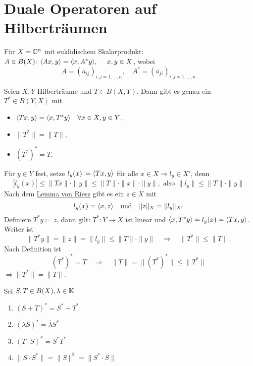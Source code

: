 


\section{Duale Operatoren auf Hilberträumen}



Für $X = \mathbb{C}^{n}$ mit euklidischem Skalarprodukt: \\
$A \in B(X) \colon \< A x , y \> = \< x , A^{*} y \>, \quad x, y \in X$, wobei
\[ A = (a_{ij})_{i, j = 1, \dotsc, n}, \quad A^{*} = (\overline{a_{ji}})_{i, j = 1, \dotsc, n} \]


\begin{satz}
	Seien $X, Y$ Hilberträume und $T \in B(X, Y)$. Dann gibt es genau ein $T^{*} \in B(Y, X)$ mit
	\begin{itemize}
		\item $\langle T x , y \rangle = \langle x , T^{*} y \rangle \quad \forall x \in X, y \in Y$,
		\item $\| T^{*} \| = \| T \|$,
		\item $\left(T	^{*}\right)^{*} = T$.
	\end{itemize}	
\end{satz}

\begin{beweis}
	Für $y \in Y$ fest, setze $l_{y}(x) \coloneqq \langle T x , y \rangle$ für alle $x \in X \Rightarrow l_{y} \in X'$, denn
	\[ | l_{y}(x) | \leq \| T x \| \cdot \| y \| \leq \|T \| \cdot \| x \| \cdot \| y \|, \text{ also } \| l_{y} \| \leq \| T \| \cdot \| y \| \]
	Nach dem \hyperref[lemma:6.3-Riesz]{Lemma von Riesz} gibt es ein $z \in X$ mit
	\[ l_{y} (x) = \langle x , z \rangle \quad \text{und} \quad \| z \|_{X} = \| l_{y} \|_{X'} \]
	Definiere $T^{*} y \coloneqq z$, dann gilt: $T^{*} \colon Y \rightarrow X$ ist linear und $\langle x , T^{*} y \rangle = l_{y}(x) = \langle T x , y \rangle$. \\
	Weiter ist 
	\[ \| T^{*} y \| = \| z \| = \| l_{y} \| \leq \| T \| \cdot \| y \| \quad \Rightarrow \quad \| T^{*} \| \leq \| T \|. \]
	Nach Definition ist 
	\[ \left( T^{*} \right)^{*} = T \quad \Rightarrow \quad \| T \| = \| \left( T^{*} \right)^{*} \| \leq \| T^{*} \| \]
	$\Rightarrow \| T^{*} \| = \| T \|$. 
\end{beweis}


\begin{bemerkung} \label{bem:19.2}
	Sei $S, T \in B(X), \lambda \in \mathbb{K}$
	\begin{enumerate}[label=\alph*\upshape)]
		\item $\left( S + T \right)^{*} = S^{*} + T^{*}$
		\item $\left( \lambda S \right)^{*} = \overline{\lambda} S^{*}$
		\item $\left( T \cdot S \right)^{*} = S^{*} T^{*}$
		\item $\| S \cdot S^{*} \| = \| S \|^{2} = \| S^{*} \cdot S \|$
	\end{enumerate}
\end{bemerkung}

